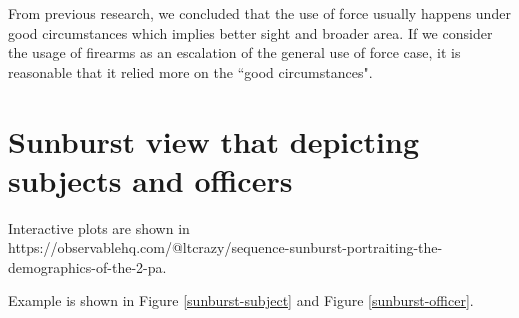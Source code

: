 \documentclass[10pt]{article}
\begin{document}
From previous research, we concluded that the use of force usually happens under good circumstances which implies better sight and broader area. If we consider the usage of firearms as an escalation of the general use of force case, it is reasonable that it relied more on the ``good circumstances".


\section{Sunburst view that depicting subjects and officers}

Interactive plots are shown in \\ https://observablehq.com/@ltcrazy/sequence-sunburst-portraiting-the-demographics-of-the-2-pa.

Example is shown in Figure \ref{sunburst-subject} and Figure \ref{sunburst-officer}.
\end{document}
